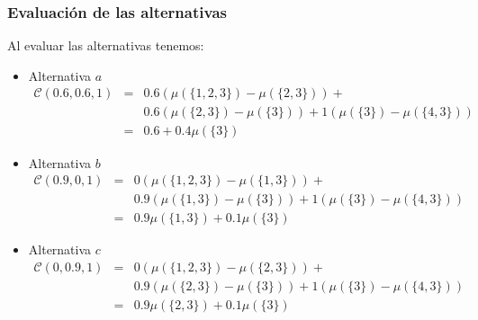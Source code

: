 \documentclass{beamer}
\theoremstyle{definition}
\begin{document}
       \begin{frame}
         \frametitle{Evaluación de las alternativas}
         Al evaluar las alternativas tenemos:
         \begin{small}
           \begin{itemize}
           \item Alternativa $a$
             \begin{eqnarray*}
               \mathcal{C}(0.6,0.6,1) &=& 0.6(\mu(\{1, 2, 3\}) -
                                          \mu(\{2, 3\})) + \\
                                      & & 0.6(\mu(\{2, 3\}) -
                                          \mu(\{3\})) +  
                                          1 (\mu(\{3\})-\mu(\{4, 3\}))\\
                                      &=& 0.6 + 0.4 \mu(\{3\})
             \end{eqnarray*}
           \item Alternativa $b$
             \begin{eqnarray*}
               \mathcal{C}(0.9,0,1) &=& 0 (\mu(\{1, 2, 3\}) -
                                        \mu(\{1, 3\})) +\\
                                    & & 0.9(\mu(\{1, 3\}) - \mu(\{3\})) +
                                        1 (\mu(\{3\}) - \mu(\{4, 3\}))\\
                                    &=& 0.9 \mu(\{1, 3\}) + 0.1 \mu(\{3\})
             \end{eqnarray*}
           \item Alternativa $c$
             \begin{eqnarray*}
               \mathcal{C}(0,0.9,1) &=& 0 (\mu(\{1, 2, 3\}) - \mu(\{2,
                                        3\})) + \\
                                    & & 0.9 (\mu(\{2, 3\}) -
                                        \mu(\{3\})) + 
                                        1 (\mu(\{3\}) - \mu(\{4, 3\}))\\
                                    &=& 0.9 \mu(\{2, 3\}) + 0.1 \mu(\{3\})
             \end{eqnarray*}
           \end{itemize}
         \end{small}
       \end{frame}
\end{document}
